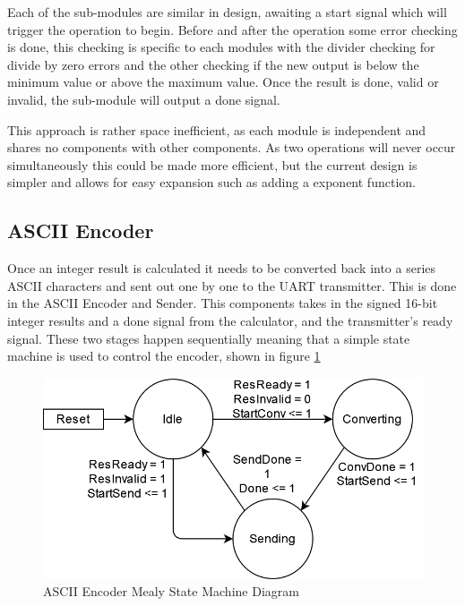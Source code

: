 \documentclass[11pt]{article}
\begin{document}
Each of the sub-modules are similar in design, awaiting a start signal which will trigger the operation to begin.
Before and after the operation some error checking is done,
this checking is specific to each modules with the divider checking for divide by zero errors and the other checking if the new output is below the minimum value or above the maximum value.
Once the result is done, valid or invalid, the sub-module will output a done signal.

This approach is rather space inefficient, as each module is independent and shares no components with other components.
As two operations will never occur simultaneously this could be made more efficient,
but the current design is simpler and allows for easy expansion such as adding a exponent function.

\subsection{ASCII Encoder}

Once an integer result is calculated it needs to be converted back into a series ASCII characters and sent out one by one to the UART transmitter.
This is done in the ASCII Encoder and Sender.
This components takes in the signed 16-bit integer results and a done signal from the calculator, and the transmitter's ready signal.
These two stages happen sequentially meaning that a simple state machine is used to control the encoder, shown in figure \ref{fig:encodersm}


\begin{figure}[H]        
    \centering
    \includegraphics[width=.66\textwidth]{EncoderSM.drawio.png}
    \caption{ASCII Encoder Mealy State Machine Diagram}
    \label{fig:encodersm}
\end{figure} 
\end{document}
